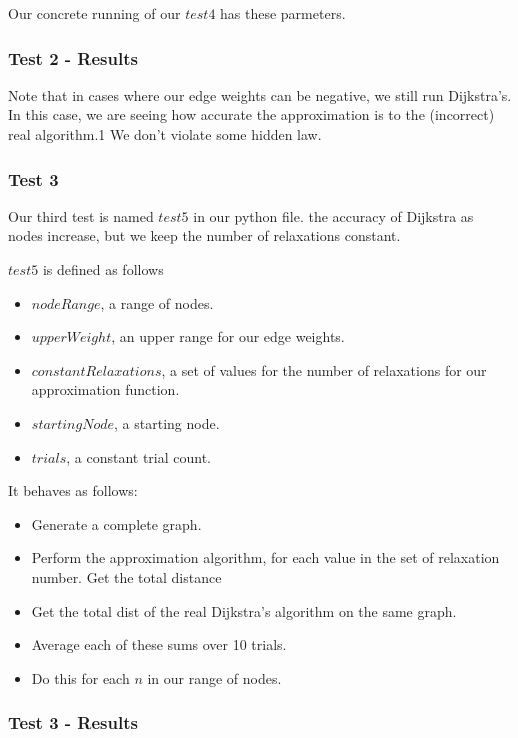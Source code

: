 \documentclass{article}
\begin{document}
Our concrete running of our $test4$ has these parmeters.


\subsubsection{Test 2 - Results}

Note that in cases where our edge weights can be negative, we still run Dijkstra's. In this case, we are seeing how accurate the approximation is to the (incorrect) real algorithm.1 We don't violate some hidden law.


\subsubsection{Test 3}

Our third test is named $test5$ in our python file. the accuracy of Dijkstra as nodes increase, but we keep the number of relaxations constant.

$test5$ is defined as follows
\begin{itemize}
 \item $nodeRange$, a range of nodes.
 \item $upperWeight$, an upper range for our edge weights.
 \item $constantRelaxations$, a set of values for the number of relaxations for our approximation function.
 \item $startingNode$,  a starting node.
 \item $trials$, a constant trial count.
\end{itemize}

It behaves as follows:
\begin{itemize}
    \item Generate a complete graph.
    \item Perform the approximation algorithm, for each value in the set of relaxation number. Get the total distance
    \item Get the total dist of the real Dijkstra's algorithm on the same graph.
    \item Average each of these sums over 10 trials.
    \item Do this for each $n$ in our range of nodes.
\end{itemize}

\subsubsection{Test 3 - Results}
\end{document}
